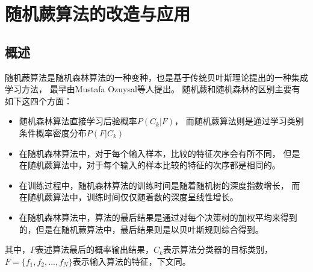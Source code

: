 \chapter{随机蕨算法的改造与应用}

\section{概述}
随机蕨算法是随机森林算法的一种变种，也是基于传统贝叶斯理论提出的一种集成学习方法，
最早由Mustafa Ozuysal等人提出\cite{ozuysal2007fast}。
随机蕨和随机森林的区别主要有如下这四个方面：
\begin{itemize}
\item
随机森林算法直接学习后验概率$P(C_k|F)$，
而随机蕨算法则是通过学习类别条件概率密度分布$P(F|C_k)$
\item
在随机森林算法中，对于每个输入样本，比较的特征次序会有所不同，
但是在随机蕨算法中，对于每个输入的样本比较的特征的次序都是相同的。
\item
在训练过程中，随机森林算法的训练时间是随着随机树的深度指数增长，
而在随机蕨算法中，训练时间仅仅随着数的深度呈线性增长。
\item
在随机森林算法中，算法的最后结果是通过对每个决策树的加权平均来得到的，但是在随机蕨算法中，最后结果则是以贝叶斯规则综合得到。
\end{itemize}
其中，$P$表述算法最后的概率输出结果，$C_k$表示算法分类器的目标类别，$F=\{f_1,f_2,...,f_N\}$表示输入算法的特征，下文同。


